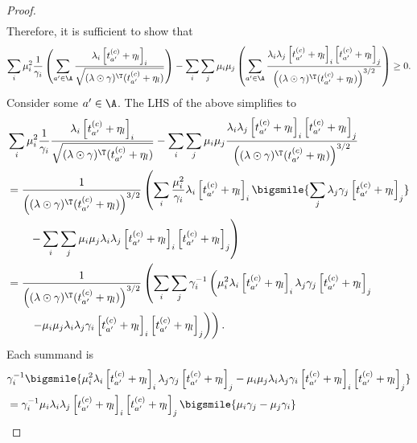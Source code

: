 \documentclass{article}
\newcommand{\1}{\mathbf{1}}
\begin{document}
\begin{proof}
\begin{align*}
\end{align*}
Therefore, it is sufficient to show that 
{
\small
\begin{align*}
    \sum_{i}\mu_i^2\frac{1}{\gamma_i}\left(\sum_{a^{\prime} \in \A} \frac{\lambda_{i} \left[t_{a'}^{(c)}+\eta_l\right]_{i}}{\sqrt{(\lambda\odot\gamma)^\T (t_{a'}^{(c)}+\eta_l)}}\right)-\sum_{i}\sum_{j}\mu_i\mu_j\left(\sum_{a^{\prime} \in \A} \frac{\lambda_{i} \lambda_{j}\left[t_{a'}^{(c)}+\eta_l\right]_{i}\left[t_{a'}^{(c)}+\eta_l\right]_{j}}{\left((\lambda\odot\gamma)^\T (t_{a'}^{(c)}+\eta_l)\right)^{3 / 2}}\right)\geq 0.
\end{align*}
}
Consider some $a'\in\A$. The LHS of the above simplifies to 
\begin{align*}
    &\sum_{i}\mu_i^2\frac{1}{\gamma_i}\frac{\lambda_{i} \left[t_{a'}^{(c)}+\eta_l\right]_{i}}{\sqrt{(\lambda\odot\gamma)^\T (t_{a'}^{(c)}+\eta_l)}}-\sum_{i}\sum_{j}\mu_i\mu_j \frac{\lambda_{i} \lambda_{j}\left[t_{a'}^{(c)}+\eta_l\right]_{i}\left[t_{a'}^{(c)}+\eta_l\right]_{j}}{\left((\lambda\odot\gamma)^\T (t_{a'}^{(c)}+\eta_l)\right)^{3 / 2}}\\
    &= \frac{1}{\left((\lambda\odot\gamma)^\T (t_{a'}^{(c)}+\eta_l)\right)^{3 / 2}}\left(\sum_i\frac{\mu_i^2}{\gamma_i}\lambda_i\left[t_{a'}^{(c)}+\eta_l\right]_{i}\bigsmile{\sum_{j}\lambda_j\gamma_j\left[t_{a'}^{(c)}+\eta_l\right]_{j}}\right.\\
    &\left.\qquad-\sum_{i}\sum_{j}\mu_i\mu_j\lambda_{i} \lambda_{j}\left[t_{a'}^{(c)}+\eta_l\right]_{i}\left[t_{a'}^{(c)}+\eta_l\right]_{j}\right)\\
    &= \frac{1}{\left((\lambda\odot\gamma)^\T (t_{a'}^{(c)}+\eta_l)\right)^{3 / 2}}\left(\sum_i\sum_j \gamma_i^{-1}\left(\mu_i^2\lambda_i\left[t_{a'}^{(c)}+\eta_l\right]_{i}\lambda_j\gamma_j\left[t_{a'}^{(c)}+\eta_l\right]_{j}\right.\right.\\
    &\left.\left.\qquad-\mu_i\mu_j\lambda_{i} \lambda_{j}\gamma_i\left[t_{a'}^{(c)}+\eta_l\right]_{i}\left[t_{a'}^{(c)}+\eta_l\right]_{j}\right)\right).
\end{align*}
Each summand is 
\begin{align*}
    &\gamma_i^{-1}\bigsmile{\mu_i^2\lambda_i\left[t_{a'}^{(c)}+\eta_l\right]_{i}\lambda_j\gamma_j\left[t_{a'}^{(c)}+\eta_l\right]_{j}-\mu_i\mu_j\lambda_{i} \lambda_{j}\gamma_i\left[t_{a'}^{(c)}+\eta_l\right]_{i}\left[t_{a'}^{(c)}+\eta_l\right]_{j}}\\
    &= \gamma_i^{-1}\mu_i\lambda_{i} \lambda_{j}\left[t_{a'}^{(c)}+\eta_l\right]_{i}\left[t_{a'}^{(c)}+\eta_l\right]_{j}\bigsmile{\mu_i\gamma_j-\mu_j\gamma_i}\\

\end{align*}
\end{proof}
\end{document}
